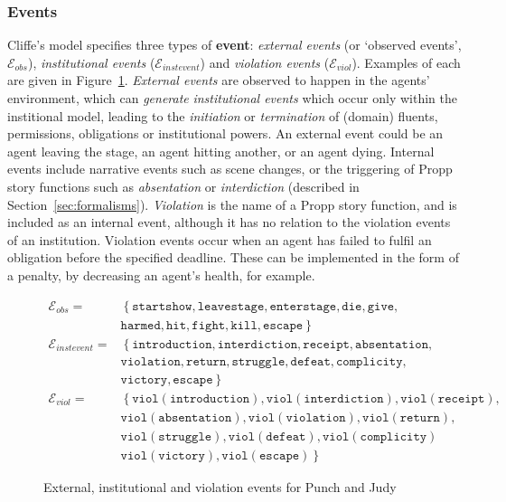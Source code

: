 \documentclass[11pt]{report}
\begin{document}
\subsubsection{Events}
\label{sec:inst-events}
Cliffe's model specifies three types of \textbf{event}: \emph{external events} (or `observed events', $\mathcal{E}_{obs}$), \emph{institutional events} ($\mathcal{E}_{instevent}$) and \emph{violation events} ($\mathcal{E}_{viol}$). Examples of each are given in Figure~\ref{fig:events}.
\emph{External events} are observed to happen in the agents' environment, which can \emph{generate} \emph{institutional events} which occur only within the institional model, leading to the \emph{initiation} or \emph{termination} of (domain) fluents, permissions, obligations or institutional powers.
An external event could be an agent leaving the stage, an agent hitting another, or an agent dying. Internal events include narrative events such as scene changes, or the triggering of Propp story functions such as \emph{absentation} or \emph{interdiction} (described in Section~\ref{sec:formalisms}). \emph{Violation} is the name of a Propp story function, and is included as an internal event, although it has no relation to the violation events of an institution.
Violation events occur when an agent has failed to fulfil an obligation before the specified deadline. These can be implemented in the form of a penalty, by decreasing an agent's health, for example.

\begin{figure}[!t]
\begin{align}
  \mathcal{E}_{obs} =& \left\{\mathtt{startshow, leavestage, enterstage, die, give,}\right.\nonumber\\
  &\left. {} \mathtt{harmed, hit, fight, kill, escape}\right\}\label{eq:eobs}\\
  \mathcal{E}_{instevent} =& \left\{\mathtt{introduction, interdiction, receipt, absentation,}\right.\nonumber\\
                         &\left. {} \mathtt{violation, return, struggle, defeat, complicity,}\right.\nonumber\\
                         &\left. {} \mathtt{victory, escape}\right\}\label{eq:einst}\\
  \mathcal{E}_{viol} =& \left\{\mathtt{viol(introduction), viol(interdiction), viol(receipt),}\right.\nonumber\\
 &\left. {} \mathtt{viol(absentation), viol(violation), viol(return),}\right.\nonumber\\
 &\left. {} \mathtt{viol(struggle), viol(defeat), viol(complicity)}\right.\nonumber\\
 &\left. {} \mathtt{viol(victory), viol(escape)}\right\}\label{eq:viol}
\end{align}
\caption{External, institutional and violation events for Punch and Judy} \label{fig:events}
\end{figure}
\end{document}
